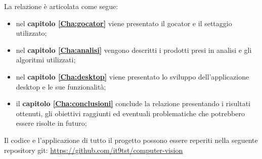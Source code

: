 \noindent La relazione è articolata come segue:
\begin{itemize}
	\item nel \textbf{capitolo \ref{Cha:gocator}} viene presentato il gocator e il settaggio utilizzato;
	\item nel \textbf{capitolo \ref{Cha:analisi}} vengono descritti i prodotti presi in analisi e gli algoritmi utilizzati;
	\item nel \textbf{capitolo \ref{Cha:desktop}} viene presentato lo sviluppo dell'applicazione desktop e le sue funzionalità;
	\item il \textbf{capitolo \ref{Cha:conclusioni}} conclude la relazione presentando i risultati ottenuti, gli obiettivi raggiunti ed eventuali problematiche che potrebbero essere risolte in futuro;
\end{itemize}
Il codice e l'applicazione di tutto il progetto possono essere reperiti nella seguente repository git: \href{https://github.com/it9tst/computer-vision}{https://github.com/it9tst/computer-vision}